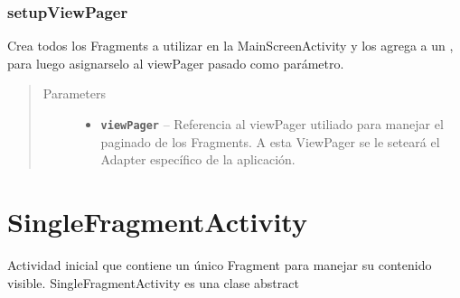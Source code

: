 \documentclass[letterpaper,10pt,english]{sphinxmanual}
\begin{document}
\subsubsection{setupViewPager}
\label{Activities/MainScreenActivity:setupviewpager}

\begin{fulllineitems}
\label{Activities/MainScreenActivity:com.fiuba.tallerii.jobify.MainScreenActivity.setupViewPager(ViewPager)}
Crea todos los Fragments a utilizar en la MainScreenActivity y los agrega a un , para luego asignarselo al viewPager pasado como parámetro.
\begin{quote}\begin{description}
\item[{Parameters}] \leavevmode\begin{itemize}
\item {} 
\textbf{\texttt{viewPager}} -- Referencia al viewPager utiliado para manejar el paginado de los Fragments. A esta ViewPager se le seteará el Adapter  específico de la aplicación.

\end{itemize}

\end{description}\end{quote}

\end{fulllineitems}



\section{SingleFragmentActivity}
\label{Activities/SingleFragmentActivity::doc}\label{Activities/SingleFragmentActivity:singlefragmentactivity}

\begin{fulllineitems}
\label{Activities/SingleFragmentActivity:com.fiuba.tallerii.jobify.SingleFragmentActivity}
Actividad inicial que contiene un único Fragment para manejar su contenido visible. SingleFragmentActivity es una clase abstract

\end{fulllineitems}
\end{document}
